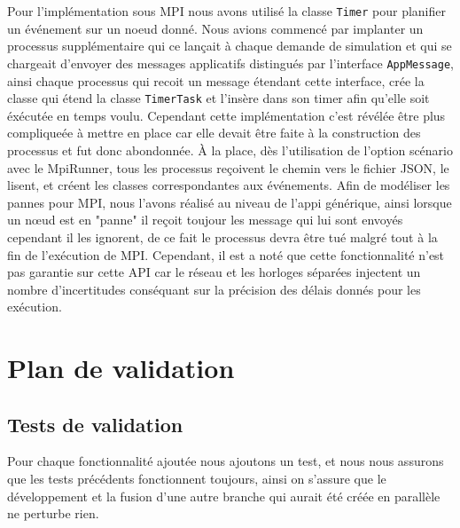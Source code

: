 \documentclass{article}
\begin{document}
				\vspace{5mm}
				Pour l'implémentation sous MPI nous avons utilisé la classe \verb|Timer| pour planifier un événement sur un noeud donné.
				\newline
				Nous avions commencé par implanter un processus supplémentaire qui ce lançait à chaque demande de simulation et qui se chargeait d'envoyer des 
				messages applicatifs distingués par l'interface \verb|AppMessage|, ainsi chaque processus qui recoit un message étendant cette interface, crée la classe 
				qui étend la classe \verb|TimerTask| et l'insère dans son timer afin qu'elle soit éxécutée en temps voulu.
				\newline
				Cependant cette implémentation c'est révélée être plus compliqueée à mettre en place car elle devait être faite à la construction des processus et fut donc abondonnée.
				\newline
				À la place, dès l'utilisation de l'option scénario avec le MpiRunner, tous les processus reçoivent le chemin vers le fichier JSON, le lisent, et créent les classes correspondantes aux événements.
				\newline
				Afin de modéliser les pannes pour MPI, nous l'avons réalisé au niveau de l'appi générique, ainsi lorsque un nœud est en "panne" il reçoit toujour les message qui lui sont envoyés cependant il les ignorent,
				de ce fait le processus devra être tué malgré tout à la fin de l'exécution de MPI.
				Cependant, il est a noté que cette fonctionnalité n'est pas garantie sur cette API car le réseau et les horloges séparées injectent un nombre d'incertitudes conséquant sur la précision des délais donnés 
				pour les exécution.
		
				
		\newpage
		\section{Plan de validation}

			\subsection{Tests de validation}
			Pour chaque fonctionnalité ajoutée nous ajoutons un test, et nous nous assurons que les tests précédents fonctionnent toujours, ainsi on s'assure que le développement et la fusion d'une autre branche qui aurait été créée en parallèle ne perturbe rien.
			\newline
\end{document}
